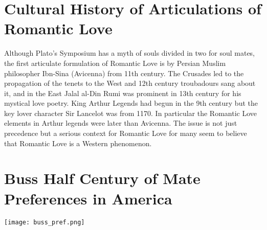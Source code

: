 \documentclass{article}
\begin{document}
\section{Cultural History of Articulations of Romantic Love}

Although Plato's Symposium has a myth of souls divided in two for soul mates, the first articulate formulation of Romantic Love is by Persian Muslim philosopher Ibn-Sina (Avicenna) from 11th century.  The Crusades led to the propagation of the tenets to the West and 12th century troubadours sang about it, and in the East Jalal al-Din Rumi was prominent in 13th century for his mystical love poetry.  King Arthur Legends had begun in the 9th century but the key lover character Sir Lancelot was from 1170.  In particular the Romantic Love elements in Arthur legends were later than Avicenna.  The issue is not just precedence but a serious context for Romantic Love for many seem to believe that Romantic Love is a Western phenomenon.

\section{Buss Half Century of Mate Preferences in America}

\texttt{[image: buss\_pref.png]}
\end{document}

